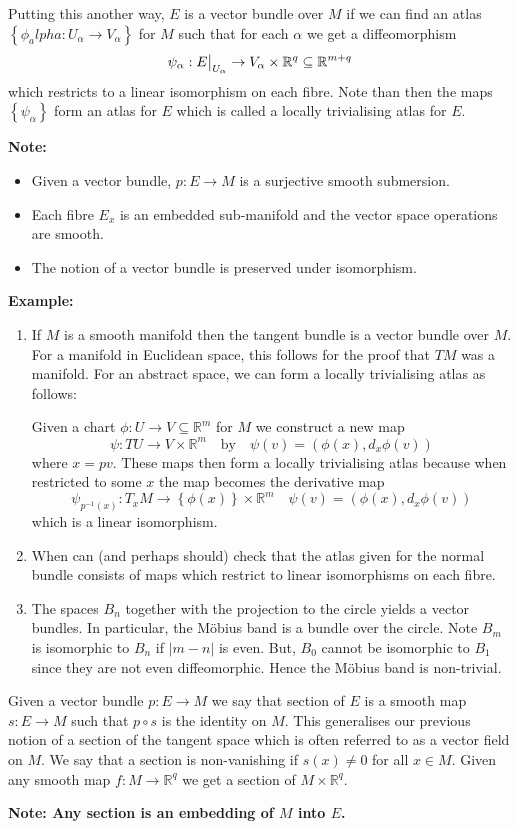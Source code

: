 \documentclass[11pt]{article}
\newcommand{\abs}[1]{|#1|}
\newcommand\restr[2]{{%
  \left.\kern-\nulldelimiterspace %
  #1 %
  \vphantom{\big|} %
  \right|_{#2} %
  }}
\newcommand{\R}{\mathbb{R}}
\newcommand{\mdf}[1]{{\color{Green} #1}}
\newenvironment{note}
	{\begin{mdframed}[backgroundcolor=white, linecolor=red, roundcorner=5pt, linewidth=1pt]\bfseries{Note:}\normalfont
	\setlength{\parindent}{0pt}}
	{\end{mdframed}}
\newenvironment{eg}
	{\begin{mdframed}[backgroundcolor=mylg,roundcorner=5pt,linewidth=0pt]\bfseries{Example:}\normalfont
	\setlength{\parindent}{0pt}}
	{\end{mdframed}}
\begin{document}
Putting this another way, $E$ is a vector bundle over $M$ if we can find an atlas $\left\{\phi_alpha : U_\alpha \to V_\alpha \right\}$ for $M$ such that for each $\alpha$ we get a diffeomorphism
\[
	\psi_\alpha: \restr{E}{U_\alpha}\to V_\alpha\times\R^q\subseteq\R^{m+q}
\]
which restricts to a linear isomorphism on each fibre.
Note than then the maps $\left\{\psi_\alpha\right\}$ form an atlas for $E$ which is called a \mdf{locally trivialising atlas} for $E$.
\begin{note}
	\begin{itemize}
		\item Given a vector bundle, $p:E\to M$ is a surjective smooth submersion.
		\item Each fibre $E_x$ is an embedded sub-manifold and the vector space operations are smooth.
		\item The notion of a vector bundle is preserved under isomorphism.
	\end{itemize}
\end{note}

\begin{eg}
\begin{enumerate}
	\item If $M$ is a smooth manifold then the tangent bundle is a vector bundle over $M$.
		For a manifold in Euclidean space, this follows for the proof that $TM$ was a manifold.
		For an abstract space, we can form a locally trivialising atlas as follows:

		Given a chart $\phi:U\to V\subseteq\R^m$ for $M$ we construct a new map
		\[
			\psi:TU\to V\times\R^m \quad\text{by}\quad\psi(v)=(\phi(x),d_x\phi(v))
		\]
		where $x=pv$.
		These maps then form a locally trivialising atlas because when restricted to some $x$ the map becomes the derivative map
		\[
			\psi_{p^{-1}(x)}:T_x M \to \left\{\phi(x)\right\}\times\R^m \quad \psi(v)=(\phi(x), d_x\phi(v))
		\]
		which is a linear isomorphism.
	\item When can (and perhaps should) check that the atlas given for the normal bundle consists of maps which restrict to linear isomorphisms on each fibre.

	\item The spaces $B_n$ together with the projection to the circle yields a vector bundles.
		In particular, the M\"obius band is a bundle over the circle.
		Note $B_m$ is isomorphic to $B_n$ if $\abs{m-n}$ is even.
		But, $B_0$ cannot be isomorphic to $B_1$ since they are not even diffeomorphic.
		Hence the M\"obius band is non-trivial.
\end{enumerate}
\end{eg}
Given a vector bundle $p:E\to M$ we say that \mdf{section} of $E$ is a smooth map $s:E\to M$ such that $p\circ s$ is the identity on $M$.
This generalises our previous notion of a section of the tangent space which is often referred to as a \mdf{vector field} on $M$.
We say that a section is \mdf{non-vanishing} if $s(x)\neq 0$ for all $x\in M$.
Given any smooth map $f:M\to\R^q$ we get a section of $M\times\R^q$.
\begin{note}
Any section is an embedding of $M$ into $E$.
\end{note}
\end{document}
